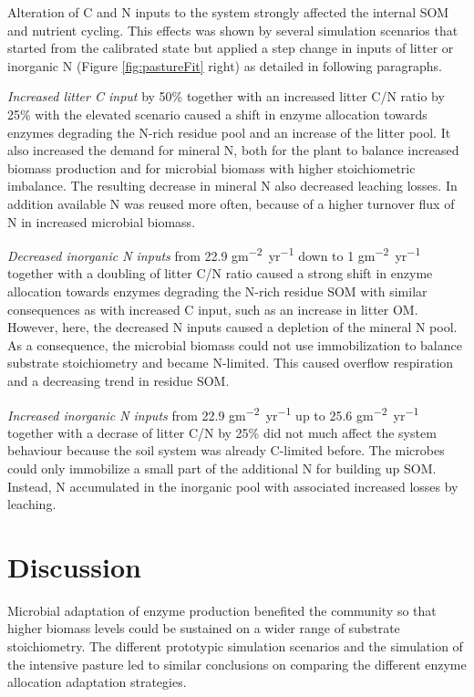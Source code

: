Alteration of C and N inputs to the system strongly affected the internal SOM
and nutrient cycling. This effects was shown by several simulation scenarios
that started from the calibrated state but applied a step change in inputs of
litter or inorganic N (Figure \ref{fig:pastureFit} right) as detailed in
following paragraphs.

\textit{Increased litter C input} by 50\% together with an increased litter C/N
ratio by 25\% with the elevated  scenario caused a shift in enzyme
allocation towards enzymes degrading the N-rich residue pool and an increase of
the litter pool. It also increased the demand for mineral N, both for the plant
to balance increased biomass production and for microbial biomass with higher
stoichiometric imbalance. The resulting decrease in mineral N also decreased
leaching losses.
In addition available N was reused more often, because of a higher
turnover flux of N in increased microbial biomass.

\textit{Decreased inorganic N inputs} from 22.9
\unit{gm^{-2}yr^{-1}} down to 1
\unit{gm^{-2}yr^{-1}} together with a doubling of litter C/N
ratio caused a strong shift in enzyme allocation towards enzymes degrading the
N-rich residue SOM with similar consequences as with increased C input,
such as an increase in litter OM. However, here, the decreased N inputs caused
a depletion of the mineral N pool.
As a consequence, the microbial biomass could not use immobilization to
balance substrate stoichiometry and became N-limited.
This caused overflow respiration and a decreasing trend in residue SOM.

\textit{Increased inorganic N inputs} from 22.9 \unit{gm^{-2}yr^{-1}} up to 25.6
\unit{gm^{-2}yr^{-1}} together with a decrase of litter C/N by 25\% did not
much affect the system behaviour because the soil system was already C-limited
before.
The microbes could only immobilize a small part of the additional N for building
up SOM. Instead, N accumulated in the inorganic pool with associated
increased losses by leaching.


\section{Discussion}
Microbial adaptation of enzyme production benefited the community so that higher
biomass levels could be sustained on a wider range of substrate stoichiometry.
The different prototypic simulation scenarios and the simulation of the
intensive pasture led to similar conclusions on comparing the different enzyme
allocation adaptation strategies.

